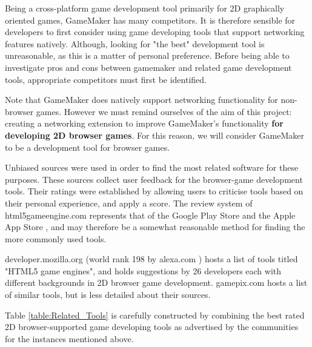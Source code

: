 \documentclass[bsc, 12pt, twoside, singlespacing, parskip, abbrevs, notimes, normalheadings, logo]{styles/infthesis}
\begin{document}
Being a cross-platform game development tool primarily for 2D graphically oriented games, GameMaker has many competitors. It is therefore sensible for developers to first consider using game developing tools that support networking features natively. Although, looking for "the best" development tool is unreasonable, as this is a matter of personal preference. Before being able to investigate pros and cons between gamemaker and related game development tools, appropriate competitors must first be identified.

Note that GameMaker does natively support networking functionality for non-browser games. However we must remind ourselves of the aim of this project: creating a networking extension to improve GameMaker's functionality \textbf{for developing 2D browser games}. For this reason, we will consider GameMaker to be a development tool for browser games.

Unbiased sources were used in order to find the most related software for these purposes. These sources collect user feedback for the browser-game development tools. Their ratings were established by allowing users to criticise tools based on their personal experience, and apply a score. The review system of html5gameengine.com \cite{html5_gamedev_tools} represents that of the Google Play Store \cite{Google_Play_Store} and the Apple App Store \cite{Apple_App_Store}, and may therefore be a somewhat reasonable method for finding the more commonly used tools.

developer.mozilla.org \cite{html5_mozilla} (world rank 198 by alexa.com \cite{alexa_ranking}) hosts a list of tools titled "HTML5 game engines", and holds suggestions by 26 developers each with different backgrounds in 2D browser game development. gamepix.com \cite{gamepix_engines} hosts a list of similar tools, but is less detailed about their sources.

Table \ref{table:Related_Tools} is carefully constructed by combining the best rated 2D browser-supported game developing tools as advertised by the communities for the instances mentioned above.
\end{document}
